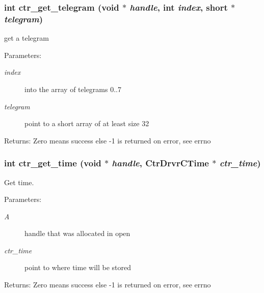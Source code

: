 \subsubsection{\setlength{\rightskip}{0pt plus 5cm}int ctr\_\-get\_\-telegram (void $\ast$ {\em handle}, int {\em index}, short $\ast$ {\em telegram})}\label{libctr_8doxygen_747788e83bc357d502fff46c25299fd3}


get a telegram 

\begin{Desc}
\item[Parameters:]
\begin{description}
\item[{\em index}]into the array of telegrams 0..7 \item[{\em telegram}]point to a short array of at least size 32 \end{description}
\end{Desc}
\begin{Desc}
\item[Returns:]Zero means success else -1 is returned on error, see errno \end{Desc}
\subsubsection{\setlength{\rightskip}{0pt plus 5cm}int ctr\_\-get\_\-time (void $\ast$ {\em handle}, Ctr\-Drvr\-CTime $\ast$ {\em ctr\_\-time})}\label{libctr_8doxygen_a25d5651b6da7f7f20f67063da1e0017}


Get time. 

\begin{Desc}
\item[Parameters:]
\begin{description}
\item[{\em A}]handle that was allocated in open \item[{\em ctr\_\-time}]point to where time will be stored \end{description}
\end{Desc}
\begin{Desc}
\item[Returns:]Zero means success else -1 is returned on error, see errno \end{Desc}
